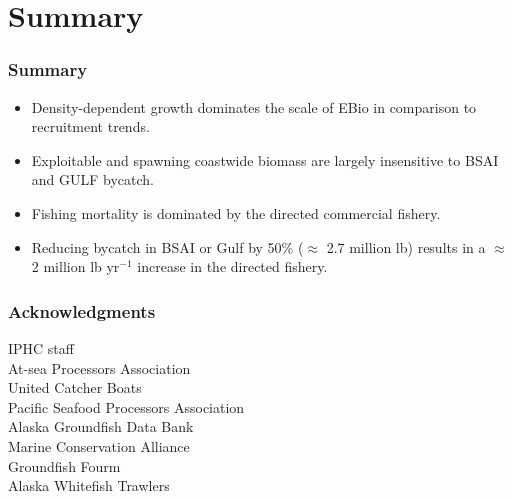 \documentclass{beamer}
\begin{document}
\section{Summary} %
\label{sec:summary}
\begin{frame}[m,shrink]\frametitle{Summary}
	\begin{itemize}
		\item<+-| alert@+> 	Density-dependent growth dominates the scale of EBio in comparison to recruitment trends.\\
		\item<+-| alert@+>	Exploitable and spawning coastwide biomass are largely insensitive to BSAI and GULF bycatch.\\
		\item<+-| alert@+>	Fishing mortality is dominated by the directed commercial fishery.\\
		\item<+-| alert@+>	Reducing bycatch in BSAI or Gulf by 50\% ($\approx$ 2.7 million lb) results in a $\approx$ 2 million lb yr$^{-1}$ increase in the directed fishery.\\
	\end{itemize}
	\vspace{-1.5cm}
		
\end{frame}
\begin{frame}[m]\frametitle{Acknowledgments}
	IPHC staff\\
	At-sea Processors Association\\
	United Catcher Boats\\
	Pacific Seafood Processors Association\\
	Alaska Groundfish Data Bank\\
	Marine Conservation Alliance\\
	Groundfish Fourm\\
	Alaska Whitefish Trawlers\\
\end{frame}
\end{document}
